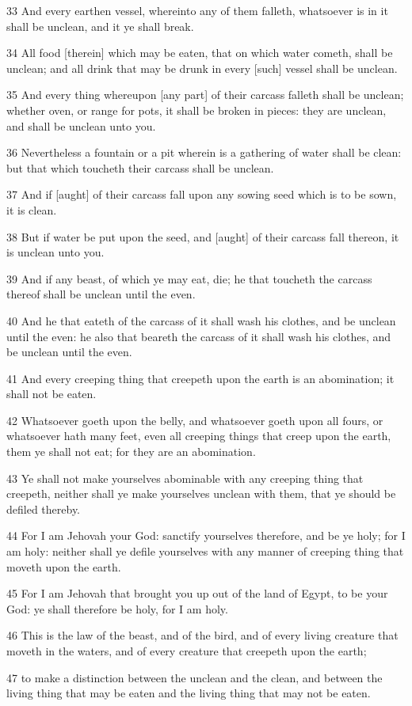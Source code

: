\par 33 And every earthen vessel, whereinto any of them falleth, whatsoever is in it shall be unclean, and it ye shall break.
\par 34 All food [therein] which may be eaten, that on which water cometh, shall be unclean; and all drink that may be drunk in every [such] vessel shall be unclean.
\par 35 And every thing whereupon [any part] of their carcass falleth shall be unclean; whether oven, or range for pots, it shall be broken in pieces: they are unclean, and shall be unclean unto you.
\par 36 Nevertheless a fountain or a pit wherein is a gathering of water shall be clean: but that which toucheth their carcass shall be unclean.
\par 37 And if [aught] of their carcass fall upon any sowing seed which is to be sown, it is clean.
\par 38 But if water be put upon the seed, and [aught] of their carcass fall thereon, it is unclean unto you.
\par 39 And if any beast, of which ye may eat, die; he that toucheth the carcass thereof shall be unclean until the even.
\par 40 And he that eateth of the carcass of it shall wash his clothes, and be unclean until the even: he also that beareth the carcass of it shall wash his clothes, and be unclean until the even.
\par 41 And every creeping thing that creepeth upon the earth is an abomination; it shall not be eaten.
\par 42 Whatsoever goeth upon the belly, and whatsoever goeth upon all fours, or whatsoever hath many feet, even all creeping things that creep upon the earth, them ye shall not eat; for they are an abomination.
\par 43 Ye shall not make yourselves abominable with any creeping thing that creepeth, neither shall ye make yourselves unclean with them, that ye should be defiled thereby.
\par 44 For I am Jehovah your God: sanctify yourselves therefore, and be ye holy; for I am holy: neither shall ye defile yourselves with any manner of creeping thing that moveth upon the earth.
\par 45 For I am Jehovah that brought you up out of the land of Egypt, to be your God: ye shall therefore be holy, for I am holy.
\par 46 This is the law of the beast, and of the bird, and of every living creature that moveth in the waters, and of every creature that creepeth upon the earth;
\par 47 to make a distinction between the unclean and the clean, and between the living thing that may be eaten and the living thing that may not be eaten.

